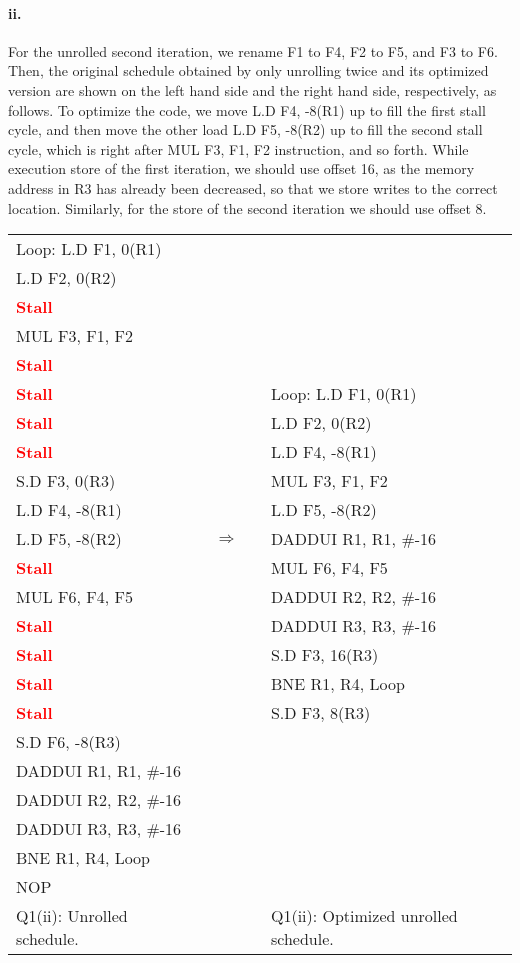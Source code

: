 \documentclass[11pt]{article}
\renewcommand{\part}[1]{\paragraph*{{#1}.}}
\newcommand{\code}[1]{\textsf{#1}}
\newcommand{\stall}{\textcolor{red}{\textbf{Stall}}}
\begin{document}
\part{ii} 
For the unrolled second iteration, we rename \code{F1} to \code{F4}, \code{F2} to \code{F5}, and \code{F3} to \code{F6}. Then, the original schedule obtained by only unrolling twice and its optimized version are shown on the left hand side and the right hand side, respectively, as follows. To optimize the code, we move \code{L.D F4, -8(R1)} up to fill the first stall cycle, and then move the other load \code{L.D F5, -8(R2)} up to fill the second stall cycle, which is right after \code{MUL F3, F1, F2} instruction, and so forth. While execution store of the first iteration, we should use offset 16, as the memory address in \code{R3} has already been decreased, so that we store writes to the correct location. Similarly, for the store of the second iteration we should use offset 8.

\begin{table}[h]
\begin{tabular}{lcccl}
	  \code{Loop:} \code{L.D F1, 0(R1)} & & & &  \\
	 \code{L.D F2, 0(R2)} & & & &  \\
	 \stall & & & &   \\
	 \code{MUL F3, F1, F2} & & & &  \\
	 \stall & & & &  \\
	 \stall & & & &  \code{Loop:} \code{L.D F1, 0(R1)}  \\
	 \stall & & & &  \code{L.D F2, 0(R2)} \\
	 \stall & & & & \code{L.D F4, -8(R1)}  \\
	 \code{S.D F3, 0(R3)} & & & & \code{MUL F3, F1, F2}  \\
	 \code{L.D F4, -8(R1)} & & & &  \code{L.D F5, -8(R2)}  \\
	 \code{L.D F5, -8(R2)} & & $\Rightarrow$ & & \code{DADDUI R1, R1, \#-16} \\
	 \stall & & & &  \code{MUL F6, F4, F5} \\
	 \code{MUL F6, F4, F5} & & & & \code{DADDUI R2, R2, \#-16}  \\
	 \stall & & & &  \code{DADDUI R3, R3, \#-16} \\
	 \stall  & & & & \code{S.D F3, 16(R3)} \\
	 \stall & & & & \code{BNE R1, R4, Loop}  \\
	 \stall & & & & \code{S.D F3, 8(R3)}  \\	 
	 \code{S.D F6, -8(R3)} & & & &  \\
	 \code{DADDUI R1, R1, \#-16} & & & &  \\
	 \code{DADDUI R2, R2, \#-16} & & & &  \\
	 \code{DADDUI R3, R3, \#-16} & & & &  \\
	 \code{BNE R1, R4, Loop} & & & &  \\
	 \code{NOP} & & & & \\
	 Q1(ii): Unrolled schedule. & & & & Q1(ii): Optimized unrolled schedule.
\end{tabular}
\label{tbl:q1p2}
\end{table}
\end{document}
